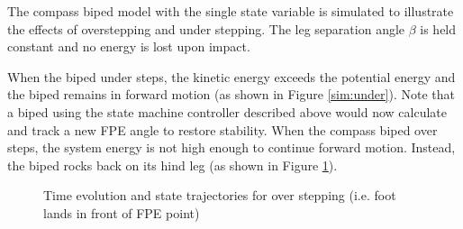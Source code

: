 The compass biped model with the single state variable is simulated to illustrate the effects of overstepping and under stepping. The leg separation angle $\beta$ is held constant and no energy is lost upon impact.

When the biped under steps, the kinetic energy exceeds the potential energy and the biped remains in forward motion (as shown in Figure \ref{sim:under}). Note that a biped using the state machine controller described above would now calculate and track a new FPE angle to restore stability. When the compass biped over steps, the system energy is not high enough to continue forward motion. Instead, the biped rocks back on its hind leg (as shown in Figure \ref{sim:over}).

\begin{figure}[!h]
	\begin{center}
	\end{center}
  	\caption{Time evolution and state trajectories for over stepping (i.e. foot lands in front of FPE point)}
	\label{sim:over}
\end{figure}

